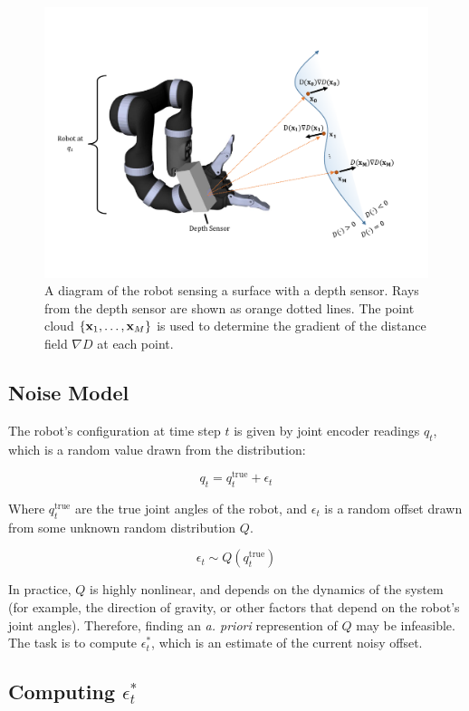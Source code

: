 \documentclass{article}
\begin{document}
\begin{figure}
	\centering
	\includegraphics[width=1.0\textwidth]{img/robot_reconstruct.pdf}
	\caption{A diagram of the robot sensing a surface with a depth sensor. Rays
	from the depth sensor are shown as orange dotted lines. The point cloud
	$\{\mathbf{x}_1, \ldots, \mathbf{x}_M\}$ is used to determine the gradient of the distance
	field $\nabla D$ at each point.}
	\label{fig:robot} 
\end{figure}

\subsection{Noise Model} 

The robot's configuration at time step $t$ is given by joint encoder readings
$q_t$, which is a random value drawn from the distribution:

$$q_t = q_t^{\text{true}} + \epsilon_t$$

\noindent Where $q_t^{\text{true}}$ are the true joint angles of the robot,
and $\epsilon_t$ is a random offset drawn from some unknown random distribution
$Q$.

$$ \epsilon_t \sim Q(q_t^{\text{true}}) $$

In practice, $Q$ is highly nonlinear, and depends on the dynamics of the
system (for example, the direction of gravity, or other factors that depend
on the robot's joint angles). Therefore, finding an \emph{a. priori}
represention of $Q$ may be infeasible. The task is to compute $\epsilon^*_t$, which is an estimate of the
current noisy offset.

\subsection{Computing $\epsilon^*_t$}
\end{document}
